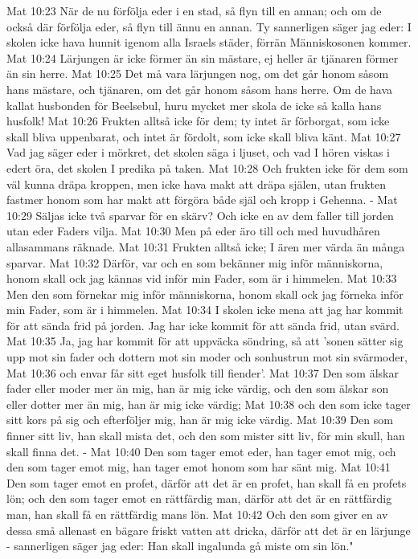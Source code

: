 Mat 10:23  När de nu förfölja eder i en stad, så flyn till en annan; och om de också där förfölja eder, så flyn till ännu en annan. Ty sannerligen säger jag eder: I skolen icke hava hunnit igenom alla Israels städer, förrän Människosonen kommer.
Mat 10:24  Lärjungen är icke förmer än sin mästare, ej heller är tjänaren förmer än sin herre.
Mat 10:25  Det må vara lärjungen nog, om det går honom såsom hans mästare, och tjänaren, om det går honom såsom hans herre. Om de hava kallat husbonden för Beelsebul, huru mycket mer skola de icke så kalla hans husfolk!
Mat 10:26  Frukten alltså icke för dem; ty intet är förborgat, som icke skall bliva uppenbarat, och intet är fördolt, som icke skall bliva känt.
Mat 10:27  Vad jag säger eder i mörkret, det skolen säga i ljuset, och vad I hören viskas i edert öra, det skolen I predika på taken.
Mat 10:28  Och frukten icke för dem som väl kunna dräpa kroppen, men icke hava makt att dräpa själen, utan frukten fastmer honom som har makt att förgöra både själ och kropp i Gehenna. -
Mat 10:29  Säljas icke två sparvar för en skärv? Och icke en av dem faller till jorden utan eder Faders vilja.
Mat 10:30  Men på eder äro till och med huvudhåren allasammans räknade.
Mat 10:31  Frukten alltså icke; I ären mer värda än många sparvar.
Mat 10:32  Därför, var och en som bekänner mig inför människorna, honom skall ock jag kännas vid inför min Fader, som är i himmelen.
Mat 10:33  Men den som förnekar mig inför människorna, honom skall ock jag förneka inför min Fader, som är i himmelen.
Mat 10:34  I skolen icke mena att jag har kommit för att sända frid på jorden. Jag har icke kommit för att sända frid, utan svärd.
Mat 10:35  Ja, jag har kommit för att uppväcka söndring, så att 'sonen sätter sig upp mot sin fader och dottern mot sin moder och sonhustrun mot sin svärmoder,
Mat 10:36  och envar får sitt eget husfolk till fiender'.
Mat 10:37  Den som älskar fader eller moder mer än mig, han är mig icke värdig, och den som älskar son eller dotter mer än mig, han är mig icke värdig;
Mat 10:38  och den som icke tager sitt kors på sig och efterföljer mig, han är mig icke värdig.
Mat 10:39  Den som finner sitt liv, han skall mista det, och den som mister sitt liv, för min skull, han skall finna det. -
Mat 10:40  Den som tager emot eder, han tager emot mig, och den som tager emot mig, han tager emot honom som har sänt mig.
Mat 10:41  Den som tager emot en profet, därför att det är en profet, han skall få en profets lön; och den som tager emot en rättfärdig man, därför att det är en rättfärdig man, han skall få en rättfärdig mans lön.
Mat 10:42  Och den som giver en av dessa små allenast en bägare friskt vatten att dricka, därför att det är en lärjunge - sannerligen säger jag eder: Han skall ingalunda gå miste om sin lön."

